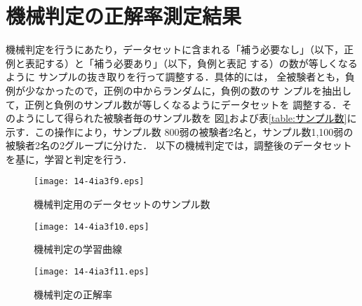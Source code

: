 \documentclass[japanese]{jnlp_1.3e}
\begin{document}
\section{機械判定の正解率測定結果}

機械判定を行うにあたり，データセットに含まれる「補う必要なし」（以下，正
例と表記する）と「補う必要あり」（以下，負例と表記
する）の数が等しくなるように
サンプルの抜き取りを行って調整する．具体的には，
全被験者とも，負例が少なかったので，正例の中からランダムに，負例の数のサ
ンプルを抽出して，正例と負例のサンプル数が等しくなるようにデータセットを
調整する．そのようにして得られた被験者毎のサンプル数を
図\ref{fig:サンプル数}および表\ref{table:サンプル数}に示す．この操作により，サンプル数
800弱の被験者2名と，サンプル数1,100弱の被験者2名の2グループに分けた．
以下の機械判定では，調整後のデータセットを基に，学習と判定を行う．

\begin{table}[b]

\end{table}

\begin{figure}[b]
 \begin{center}
    \texttt{[image: 14-4ia3f9.eps]}
 \end{center}
 \caption{機械判定用のデータセットのサンプル数}
 \label{fig:サンプル数}
\end{figure}

\begin{figure}[t]
\begin{minipage}{199pt}
  \begin{center}
    \texttt{[image: 14-4ia3f10.eps]}
  \end{center}
  \caption{機械判定の学習曲線}
  \label{fig:学習曲線}
\end{minipage}
\hfill
\begin{minipage}{171pt}
\vspace{13pt}
 \begin{center}
    \texttt{[image: 14-4ia3f11.eps]}
  \end{center}
  \caption{機械判定の正解率}
  \label{fig:正解率}
 \end{minipage}
\end{figure}
\begin{table}[t]

\end{table}
\end{document}
